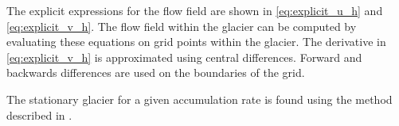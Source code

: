 The explicit expressions for the flow field are shown in \eqref{eq:explicit_u_h} and \eqref{eq:explicit_v_h}. The flow field within the glacier can be computed by evaluating these equations on grid points within the glacier. The derivative in \eqref{eq:explicit_v_h} is approximated using central differences. Forward and backwards differences are used on the boundaries of the grid.

The stationary glacier for a given accumulation rate is found using the method described in .


